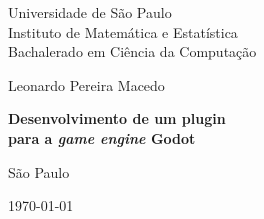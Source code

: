 \thispagestyle{empty}
\begin{center}
    \vspace*{2.3cm}
    Universidade de São Paulo\\
    Instituto de Matemática e Estatística\\
    Bachalerado em Ciência da Computação


    \vspace*{3cm}
    \Large{Leonardo Pereira Macedo}


    \vspace{3cm}
    \textbf{\Large{Desenvolvimento de um plugin\\
    para a \textit{game engine} Godot}}


    \vskip 5cm
    \normalsize{São Paulo}

    \today
\end{center}
